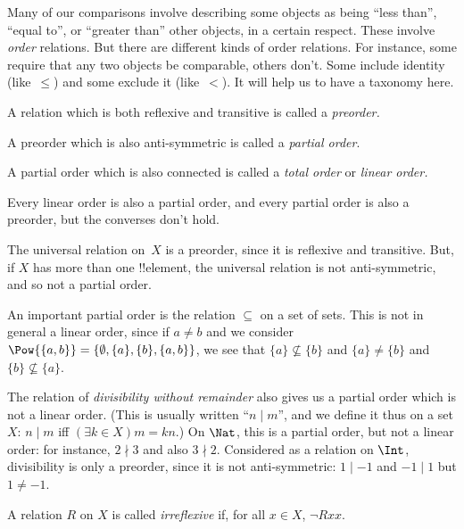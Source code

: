\documentclass[../../../include/open-logic-section]{subfiles}
\begin{document}

\begin{explain}
Many of our comparisons involve describing some objects as being ``less than'', ``equal to'', or ``greater than'' other objects, in a certain respect. These involve \emph{order} relations. But there are different kinds of order relations. For instance, some require that any two objects be comparable, others don't. Some include identity (like~$\le$) and some exclude it (like~$<$). It will help us to have a taxonomy here.
\end{explain}

\begin{defn}[Preorder]
A relation which is both reflexive and transitive is called a
\emph{preorder.}  
\end{defn}

\begin{defn}
A preorder which is also anti-symmetric is called a
\emph{partial order}.
\end{defn}

\begin{defn}
A partial order which is also connected is called a
\emph{total order} or \emph{linear order.}
\end{defn}\noindent
Every linear order is also a partial order, and every partial order is
also a preorder, but the converses don't hold. 


\begin{ex}
The universal relation
on~$X$ is a preorder, since it is reflexive and transitive. But, if
$X$ has more than one !!{element}, the universal relation is not
anti-symmetric, and so not a partial order. %
\end{ex}
\begin{ex}
An important partial order is the relation $\subseteq$ on a set of sets. This is not in general a linear order, since if $a \neq b$ and we consider $\Pow{\{a, b\}} = \{\emptyset, \{a\}, \{b\}, \{a,b\}\}$, we see that $\{a\} \nsubseteq \{b\}$ and $\{a\} \neq \{b\}$ and $\{b\} \nsubseteq \{a\}$.
\end{ex}
\begin{ex}
The relation of \emph{divisibility without remainder} also gives us a partial order which is not a linear order. (This is usually written
``$n\mid m$'', and we define it thus on a set $X$: $n \mid m$ iff $(\exists k \in X)m = kn$.) On $\Nat$, this is a partial order, but not a linear order: for instance, $2\nmid3$ and also
$3\nmid2$. Considered as a relation on $\Int$, divisibility is only a
preorder, since it is not anti-symmetric: $1\mid-1$ and $-1\mid1$ but
$1\neq-1$. 
\end{ex}
\begin{defn}[Irreflexivity]
A relation $R$ on $X$ is called \emph{irreflexive} if, for all $x \in
X$, $ \lnot Rxx$. 
\end{defn}
\end{document}
